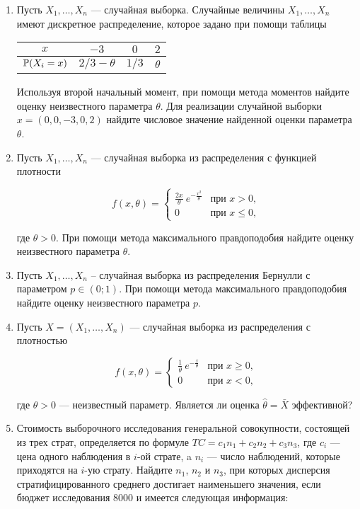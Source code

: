 \begin{enumerate}
\item Пусть $X_1, \ldots, X_n$ — случайная выборка. Случайные величины $X_1, \ldots, X_n$ имеют дискретное распределение, которое задано при помощи таблицы

\begin{center}
\begin{tabular}{cccc}
\toprule
 $x$ & $-3$  &$ 0 $  & $2 $  \\
 \midrule
 $\P(X_i = x)$ & $2/3 - \theta$ & $1/3$ & $\theta$ \\
 \bottomrule
\end{tabular}
\end{center}

Используя второй начальный момент, при помощи метода моментов
найдите оценку неизвестного параметра $\theta$.
Для реализации случайной выборки $x=(0, 0, -3, 0, 2)$
найдите числовое значение найденной оценки параметра $\theta$.

\item Пусть $X_1, \ldots, X_n$ — случайная выборка из распределения
с функцией плотности

\[
f(x,\theta) =
\begin{cases}
\frac{2x}{\theta} \ e^{-\frac{x^2}{\theta}} & \text{при } x>0, \\
0 & \text{при } x \leq 0,
\end{cases}
\]

где $\theta > 0$. При помощи метода максимального правдоподобия найдите оценку неизвестного параметра $\theta$.

\item Пусть $X_1, \ldots, X_n$ – случайная выборка из распределения Бернулли
с параметром $p \in (0;1)$.
При помощи метода максимального правдоподобия найдите оценку
неизвестного параметра $p$.

\item Пусть $X=(X_1, \ldots, X_n)$ — случайная выборка из распределения с плотностью

\[
f(x,\theta) =
\begin{cases}
\frac{1}{\theta} \ e^{-\frac{x}{\theta}} & \text{при } x \geq 0, \\
0 & \text{при } x < 0, \end{cases}
\]

где $\theta > 0$ — неизвестный параметр. Является ли оценка  $\hat{\theta} = \bar{X}$ эффективной?

\item Стоимость выборочного исследования генеральной совокупности,
состоящей из трех страт, определяется по формуле
$TC = c_1n_1 + c_2n_2 + c_3n_3$, где $c_i$ — цена одного наблюдения в $i$-ой страте,
a $n_i$ — число наблюдений, которые приходятся на $i$-ую страту.
Найдите $n_1$, $n_2$ и $n_3$, при которых дисперсия стратифицированного среднего
достигает наименьшего значения,
если бюджет исследования 8000 и имеется следующая информация:


\end{enumerate}
